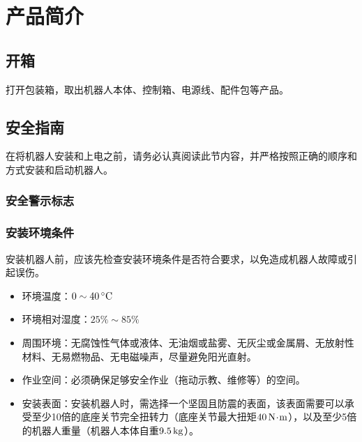 \chapter{产品简介}
\section{开箱}
打开包装箱，取出机器人本体、控制箱、电源线、配件包等产品。

\section{安全指南}
\label{sec:安全指南}
在将机器人安装和上电之前，请务必认真阅读此节内容，并严格按照正确的顺序和方式安装和启动机器人。

\subsection{安全警示标志}




\subsection{安装环境条件}
安装机器人前，应该先检查安装环境条件是否符合要求，以免造成机器人故障或引起误伤。

\begin{itemize}
\item 环境温度：$0\sim 40\,\mathrm{^\circ C}$
\item 环境相对湿度：$25\%\sim 85\%$
\item 周围环境：无腐蚀性气体或液体、无油烟或盐雾、无灰尘或金属屑、无放射性材料、无易燃物品、无电磁噪声，尽量避免阳光直射。
\item 作业空间：必须确保足够安全作业（拖动示教、维修等）的空间。
\item 安装表面：安装机器人时，需选择一个坚固且防震的表面，该表面需要可以承受至少10倍的底座关节完全扭转力（底座关节最大扭矩$40 \,\mathrm{N\!\cdot\! m}$），以及至少5倍的机器人重量（机器人本体自重$9.5 \,\mathrm{kg}$）。
\end{itemize}


